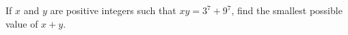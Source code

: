 If $x$ and $y$ are positive integers such that $xy=3^7+9^7$, find the smallest possible value of $x+y$.
